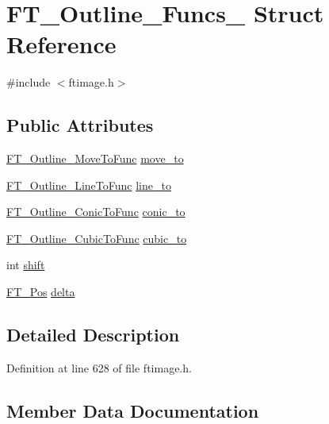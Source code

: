 \hypertarget{struct_f_t___outline___funcs__}{}\section{F\+T\+\_\+\+Outline\+\_\+\+Funcs\+\_\+ Struct Reference}
\label{struct_f_t___outline___funcs__}


{\ttfamily \#include $<$ftimage.\+h$>$}

\subsection*{Public Attributes}
\begin{DoxyCompactItemize}
\item 
\mbox{\hyperlink{ftimage_8h_adb1c27eedf361dcd3d331fa266a466af}{F\+T\+\_\+\+Outline\+\_\+\+Move\+To\+Func}} \mbox{\hyperlink{struct_f_t___outline___funcs___abd53463a59a1ae2c6998e619c2ab6a65}{move\+\_\+to}}
\item 
\mbox{\hyperlink{ftimage_8h_a522526513387d998682d59515fe93ccf}{F\+T\+\_\+\+Outline\+\_\+\+Line\+To\+Func}} \mbox{\hyperlink{struct_f_t___outline___funcs___a876fc8ca7541786cd3c4ec3806f88360}{line\+\_\+to}}
\item 
\mbox{\hyperlink{ftimage_8h_a44b83dd26e7f37eae86aee33ff3efd9b}{F\+T\+\_\+\+Outline\+\_\+\+Conic\+To\+Func}} \mbox{\hyperlink{struct_f_t___outline___funcs___a09681f5a64189066d3fba3cf398a135b}{conic\+\_\+to}}
\item 
\mbox{\hyperlink{ftimage_8h_a9c6f8d42a1660a57f55614baaa4b61b2}{F\+T\+\_\+\+Outline\+\_\+\+Cubic\+To\+Func}} \mbox{\hyperlink{struct_f_t___outline___funcs___aa3e0c1bacb181a5f43c104ab7f72cfda}{cubic\+\_\+to}}
\item 
int \mbox{\hyperlink{struct_f_t___outline___funcs___a540c246669b21b86cb405b3d9019cfda}{shift}}
\item 
\mbox{\hyperlink{ftimage_8h_af5f230f4b253d4c7715fd2e595614c90}{F\+T\+\_\+\+Pos}} \mbox{\hyperlink{struct_f_t___outline___funcs___a3c3121398b3ff564b4f3fd5b2a318e5e}{delta}}
\end{DoxyCompactItemize}


\subsection{Detailed Description}


Definition at line 628 of file ftimage.\+h.



\subsection{Member Data Documentation}
\mbox{\label{struct_f_t___outline___funcs___a09681f5a64189066d3fba3cf398a135b}} 
